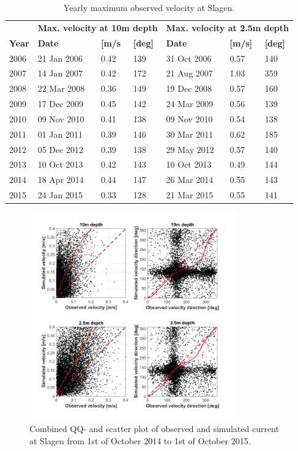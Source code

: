 \begin{table}[ht]
\caption{Yearly maximum observed velocity at Slagen.}
\label{tab:Slagen_max}
\centering
\begin{tabular}{|l|lll|lll|}
\hline 
& \multicolumn{3}{|l|}{\bf Max. velocity at 10m depth} & \multicolumn{3}{|l|}{\bf Max. velocity at 2.5m depth} \\
{\bf Year} & {\bf Date} & {\bf [m/s} & {\bf [deg]} & {\bf Date} & {\bf [m/s]} & {\bf [deg]} \\ \hline 
\small 2006 & 21 Jan 2006 & 0.42 & 139 & 31 Oct 2006 & 0.57 & 140 \\
\small 2007 & 14 Jan 2007 & 0.42 & 172 & 21 Aug 2007 & 1.03 & 359 \\
\small 2008 & 22 Mar 2008 & 0.36 & 149 & 19 Dec 2008 & 0.57 & 160 \\
\small 2009 & 17 Dec 2009 & 0.45 & 142 & 24 Mar 2009 & 0.56 & 139 \\
\small 2010 & 09 Nov 2010 & 0.41 & 138 & 09 Nov 2010 & 0.54 & 138 \\
\small 2011 & 01 Jan 2011 & 0.39 & 146 & 30 Mar 2011 & 0.62 & 185 \\
\small 2012 & 05 Dec 2012 & 0.39 & 138 & 29 May 2012 & 0.57 & 140 \\
\small 2013 & 10 Oct 2013 & 0.42 & 143 & 10 Oct 2013 & 0.49 & 144 \\
\small 2014 & 18 Apr 2014 & 0.44 & 147 & 26 Mar 2014 & 0.55 & 143 \\
\small 2015 & 24 Jan 2015 & 0.33 & 128 & 21 Mar 2015 & 0.55 & 141 \\
\hline
\end{tabular}
\end{table}

\begin{figure}[ht]
\centerline{
\includegraphics*[trim=0cm 0cm 0cm 0cm,clip=true,width=0.8\textwidth]{Figurer/Slagen_QQ}}
\caption{\small
Combined QQ- and scatter plot of observed and simulated current at Slagen from 1st of October 2014 to 1st of October 2015.}
\label{fig:Slagen_QQ}
\end{figure}

